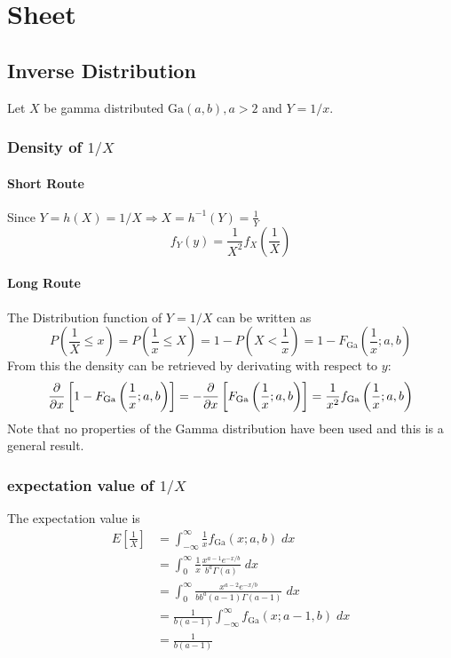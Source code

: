 \section{Sheet}
\subsection*{Inverse Distribution}
Let $X$ be gamma distributed $\text{Ga}\left(a,b\right),a>2$ and $Y = 1/x$.
\subsubsection{Density of $1/X$}
\paragraph{Short Route}
Since $Y=h\left(X\right)=1/X\Longrightarrow X=h^{-1}\left(Y\right)=\frac{1}{Y}$
\begin{equation}
    f_Y(y)=\frac{1}{X^2}f_X\left(\frac{1}{X}\right)
\end{equation}
\paragraph{Long Route}
The Distribution function of $Y=1/X$ can be written as
\begin{equation}
    P\left(\frac{1}{X}\leq x\right)=P\left(\frac{1}{x}\leq X\right)=1-P\left(X<\frac{1}{x}\right)=1-F_{\text{Ga}}\left(\frac{1}{x};a,b\right)
\end{equation}
From this the density can be retrieved by derivating with respect to $y$:
\begin{equation}
    \pdv{x}\left[1-F_{\text{Ga}}\left(\frac{1}{x};a,b\right)\right]=-\pdv{x}\left[F_{\text{Ga}}\left(\frac{1}{x};a,b\right)\right]=\frac{1}{x^2}f_{\text{Ga}}\left(\frac{1}{x};a,b\right)
\end{equation}
Note that no properties of the Gamma distribution have been used and this is a general result.
\subsubsection{expectation value of $1/X$}
The expectation value is
\begin{align}
    E\left[\frac{1}{X}\right]&=\int_{-\infty}^{\infty}\frac{1}{x}f_{\text{Ga}}\left(x;a,b\right)\;dx
    \\&=\int_0^\infty \frac{1}{x}\frac{x^{a-1}e^{-x/b}}{b^a\Gamma\left(a\right)}\;dx
    \\&=\int_0^\infty \frac{x^{a-2}e^{-x/b}}{bb^a\left(a-1\right)\Gamma\left(a-1\right)}\;dx
    \\&=\frac{1}{b\left(a-1\right)}\int_{-\infty}^\infty f_\text{Ga}\left(x;a-1,b\right)\;dx
    \\&=\frac{1}{b\left(a-1\right)}
\end{align}
